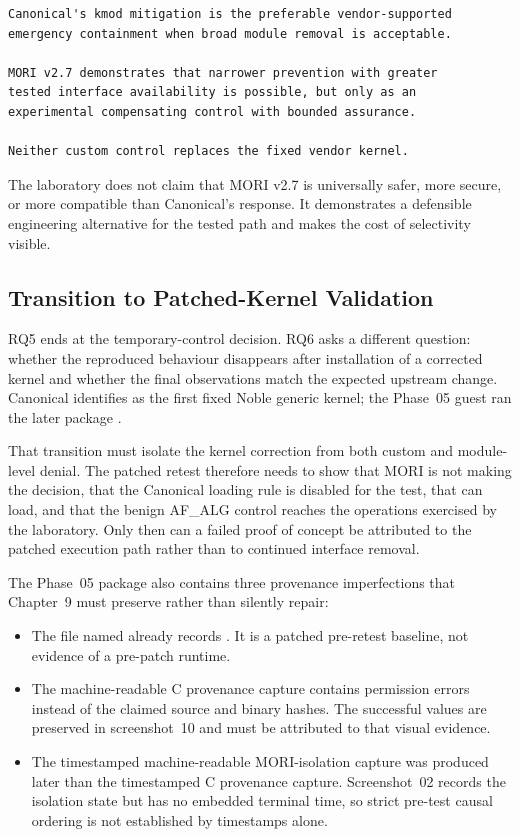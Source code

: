 \begin{lstlisting}
Canonical's kmod mitigation is the preferable vendor-supported
emergency containment when broad module removal is acceptable.

MORI v2.7 demonstrates that narrower prevention with greater
tested interface availability is possible, but only as an
experimental compensating control with bounded assurance.

Neither custom control replaces the fixed vendor kernel.
\end{lstlisting}

The laboratory does not claim that MORI v2.7 is universally safer, more secure,
or more compatible than Canonical's response. It demonstrates a defensible
engineering alternative for the tested path and makes the cost of selectivity
visible.

\subsection{Transition to Patched-Kernel Validation}

RQ5 ends at the temporary-control decision. RQ6 asks a different question:
whether the reproduced behaviour disappears after installation of a corrected
kernel and whether the final observations match the expected upstream change.
Canonical identifies  as the first fixed Noble generic
kernel; the Phase~05 guest ran the later  package
\cite{ubuntu-copyfail-cve}.

That transition must isolate the kernel correction from both custom and
module-level denial. The patched retest therefore needs to show that MORI is not
making the decision, that the Canonical loading rule is disabled for the test,
that  can load, and that the benign AF\_ALG control reaches
the operations exercised by the laboratory. Only then can a failed proof of
concept be attributed to the patched execution path rather than to continued
interface removal.

The Phase~05 package also contains three provenance imperfections that Chapter~9
must preserve rather than silently repair:

\begin{itemize}
    \item The file named  already records
    . It is a patched pre-retest baseline, not evidence
    of a pre-patch runtime.

    \item The machine-readable C provenance capture contains permission errors
    instead of the claimed source and binary hashes. The successful values are
    preserved in screenshot~10 and must be attributed to that visual evidence.

    \item The timestamped machine-readable MORI-isolation capture was produced
    later than the timestamped C provenance capture. Screenshot~02 records the
    isolation state but has no embedded terminal time, so strict pre-test causal
    ordering is not established by timestamps alone.
\end{itemize}

